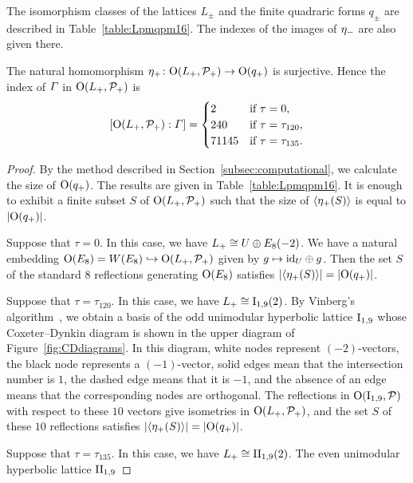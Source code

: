 \documentclass{amsart} %
\begin{document}
%
The isomorphism classes of the lattices $L_{\pm}$ and 
the finite quadraric forms $q_{\pm}$ are described in Table~\ref{table:Lpmqpm16}.
The indexes of the images of ${\eta}_{-}$ are also given there.
%
\begin{proposition}\label{prop:etaplussurj16}
The natural homomorphism ${\eta}_{+}\colon \mathord{\mathrm{O}}(L_{+}, \mathord{\mathcal{P}}_{+})\to \mathord{\mathrm{O}}(q_{+})$ is surjective.
Hence the index of $\varGamma$ in $\mathord{\mathrm{O}}(L_{+}, \mathord{\mathcal{P}}_{+})$ is
\[
[\mathord{\mathrm{O}}(L_{+}, \mathord{\mathcal{P}}_{+}): \varGamma]=
\begin{cases}
2 & \textrm{if $\tau=0$}, \\
240 & \textrm{if $\tau=\tau_{120}$}, \\
71145 & \textrm{if $\tau=\tau_{135}$}.
\end{cases}
\]
\end{proposition}
%
\begin{proof}
By the method described in Section~\ref{subsec:computational},
we calculate the size of $\mathord{\mathrm{O}}(q_{+})$.
The results are given in Table~\ref{table:Lpmqpm16}.
It is enough to exhibit a finite subset $S$ 
of $\mathord{\mathrm{O}}(L_{+}, \mathord{\mathcal{P}}_{+})$ such that 
the size of $\langle {{\eta}_{+}(S)} \rangle$ is equal to $|\mathord{\mathrm{O}}(q_{+})|$.
\par
Suppose that $\tau=0$.
In this case,
we have $L_{+}\cong U\oplus E_8(-2)$.
We have a natural embedding $\mathord{\mathrm{O}}(E_8)=W(E_8)\hookrightarrow \mathord{\mathrm{O}}(L_{+}, \mathord{\mathcal{P}}_{+})$
given by $g\mapsto \mathord{\mathrm{id}}_U \oplus g$.
Then %
the set $S$ of the standard $8$ reflections generating $\mathord{\mathrm{O}}(E_8)$ 
satisfies $|\langle {{\eta}_{+}(S)} \rangle|=|\mathord{\mathrm{O}}(q_{+})|$.
%
\par
Suppose that $\tau=\tau_{120}$.
In this case,
we have $L_{+}\cong \mathrm{I}_{1, 9}(2)$.
By Vinberg’s algorithm~\cite{Vinberg1985}, 
we obtain a basis of the odd unimodular hyperbolic lattice $\mathrm{I}_{1,9}$ 
whose Coxeter–Dynkin diagram is shown in the upper diagram of Figure~\ref{fig:CDdiagrams}. 
In this diagram, 
white nodes represent $(-2)$-vectors, 
the black node represents a $(-1)$-vector,
solid edges mean that the intersection number is $1$, 
the dashed edge means that it is $-1$, 
and the absence of an edge means that the corresponding nodes are orthogonal.
The reflections in $\mathord{\mathrm{O}}(\mathrm{I}_{1,9}, \mathord{\mathcal{P}})$
with respect to these $10$ vectors
give isometries in $\mathord{\mathrm{O}}(L_{+}, \mathord{\mathcal{P}}_{+})$, and 
 the set $S$ of these $10$ reflections
satisfies $|\langle {{\eta}_{+}(S)} \rangle|=|\mathord{\mathrm{O}}(q_{+})|$.
%
\par
Suppose that $\tau=\tau_{135}$.
In this case,
we have $L_{+}\cong \mathrm{II}_{1, 9}(2)$.
The even unimodular hyperbolic lattice $\mathrm{II}_{1,9}$ 

\end{proof}
\end{document}
